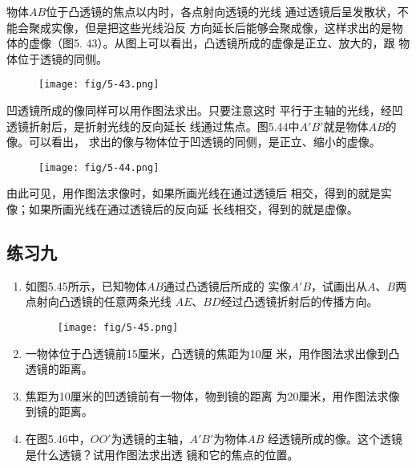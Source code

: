             物体$AB$位于凸透镜的焦点以内时，各点射向透镜的光线
            通过透镜后呈发散状，不能会聚成实像，但是把这些光线沿反
            方向延长后能够会聚成像，这样求出的是物体的虚像（图5.
            43）。从图上可以看出，凸透镜所成的虚像是正立、放大的，跟
            物体位于透镜的同侧。

            \begin{figure}[htp]\centering
                \texttt{[image: fig/5-43.png]}
                \caption{}
                \end{figure}

                凹透镜所成的像同样可以用作图法求出。只要注意这时
                平行于主轴的光线，经凹透镜折射后，是折射光线的反向延长
                线通过焦点。图5.44中$A'B'$就是物体$AB$的像。可以看出，
                求出的像与物体位于凹透镜的同侧，是正立、缩小的虚像。

                \begin{figure}[htp]\centering
                    \texttt{[image: fig/5-44.png]}
                    \caption{}
                    \end{figure}

                    由此可见，用作图法求像时，如果所画光线在通过透镜后
                    相交，得到的就是实像；如果所画光线在通过透镜后的反向延
                    长线相交，得到的就是虚像。


\subsection*{练习九}
\begin{enumerate}
    \item 如图5.45所示，已知物体$AB$通过凸透镜后所成的
    实像$A'B$，试画出从$A$、$B$两点射向凸透镜的任意两条光线
    $AE$、$BD$经过凸透镜折射后的传播方向。
    \begin{figure}[htp]\centering
        \texttt{[image: fig/5-45.png]}
        \caption{}
        \end{figure}

    \item 一物体位于凸透镜前15厘米，凸透镜的焦距为10厘
米，用作图法求出像到凸透镜的距离。
\item 焦距为10厘米的凹透镜前有一物体，物到镜的距离
为20厘米，用作图法求像到镜的距离。
\item 在图5.46中，$OO'$为透镜的主轴，$A'B'$为物体$AB$
经透镜所成的像。这个透镜是什么透镜？试用作图法求出透
镜和它的焦点的位置。                    
\begin{figure}[htp]\centering
    \caption{}
    \end{figure}
\end{enumerate}

